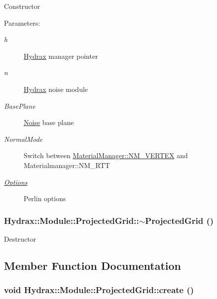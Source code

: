 Constructor \begin{Desc}
\item[Parameters:]
\begin{description}
\item[{\em h}]\hyperlink{class_hydrax_1_1_hydrax}{Hydrax} manager pointer \item[{\em n}]\hyperlink{class_hydrax_1_1_hydrax}{Hydrax} noise module \item[{\em BasePlane}]\hyperlink{namespace_hydrax_1_1_noise}{Noise} base plane \item[{\em NormalMode}]Switch between \hyperlink{class_hydrax_1_1_material_manager_aa14689cd1c259f48954dfecda9b296ffe4d6257f673cf503a9905fb2576288f}{MaterialManager::NM\_\-VERTEX} and Materialmanager::NM\_\-RTT \item[{\em \hyperlink{struct_hydrax_1_1_module_1_1_projected_grid_1_1_options}{Options}}]Perlin options \end{description}
\end{Desc}
\hypertarget{class_hydrax_1_1_module_1_1_projected_grid_7b656225a58519ec687225f1f809010c}{
\subsubsection[{$\sim$ProjectedGrid}]{\setlength{\rightskip}{0pt plus 5cm}Hydrax::Module::ProjectedGrid::$\sim$ProjectedGrid ()}}
\label{class_hydrax_1_1_module_1_1_projected_grid_7b656225a58519ec687225f1f809010c}


Destructor 

\subsection{Member Function Documentation}
\hypertarget{class_hydrax_1_1_module_1_1_projected_grid_86e4648a741558934e664f7400082742}{
\subsubsection[{create}]{\setlength{\rightskip}{0pt plus 5cm}void Hydrax::Module::ProjectedGrid::create ()}}
\label{class_hydrax_1_1_module_1_1_projected_grid_86e4648a741558934e664f7400082742}


